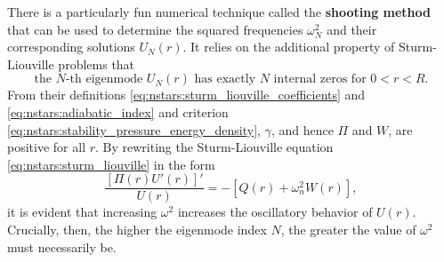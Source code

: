 There is a particularly fun numerical technique called the \textbf{shooting method} that can be used to determine the squared frequencies $\omega_N^2$ and their corresponding solutions $U_N(r)$.
It relies on the additional property of Sturm-Liouville problems that
\begin{equation}
	\text{the $N$-th eigenmode $U_N(r)$ has exactly $N$ internal zeros for $0 < r < R$} .
\end{equation}
From their definitions \eqref{eq:nstars:sturm_liouville_coefficients} and \eqref{eq:nstars:adiabatic_index} and criterion \eqref{eq:nstars:stability_pressure_energy_density}, $\gamma$, and hence $\Pi$ and $W$, are positive for all $r$.
By rewriting the Sturm-Liouville equation \eqref{eq:nstars:sturm_liouville} in the form
\begin{equation}
\frac{\left[ \Pi(r) U'(r) \right]'}{U(r)} = - \left[ Q(r) + \omega_n^2 W(r) \right] ,
\end{equation}
it is evident that increasing $\omega^2$ increases the oscillatory behavior of $U(r)$.
Crucially, then, the higher the eigenmode index $N$, the greater the value of $\omega^2$ must necessarily be.



